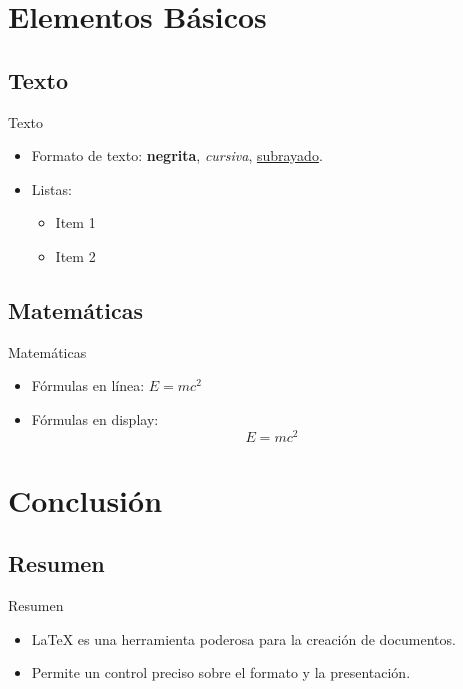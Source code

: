 \documentclass[12]{beamer}
\begin{document}
\section{Elementos Básicos}
\subsection{Texto}
\begin{frame}{Texto}
  \begin{itemize}
    \item Formato de texto: \textbf{negrita}, \textit{cursiva}, \underline{subrayado}.
    \item Listas: \begin{itemize}
      \item Item 1
      \item Item 2
    \end{itemize}
  \end{itemize}
\end{frame}

\subsection{Matemáticas}
\begin{frame}{Matemáticas}
  \begin{itemize}
    \item Fórmulas en línea: \( E = mc^2 \)
    \item Fórmulas en display: \[ E = mc^2 \]
  \end{itemize}
\end{frame}

\section{Conclusión}
\subsection{Resumen}
\begin{frame}{Resumen}
  \begin{itemize}
    \item LaTeX es una herramienta poderosa para la creación de documentos.
    \item Permite un control preciso sobre el formato y la presentación.
  \end{itemize}
\end{frame}
\end{document}
